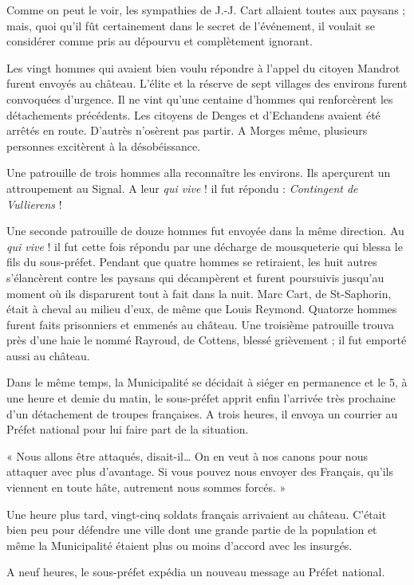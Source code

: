 \documentclass[french,twoside]{book} %
\newenvironment{quoteblock}%
  {\begin{quoting}}
  {\end{quoting}}
\newenvironment{quotebar}{%
    \def\FrameCommand{{\color{rubric!10!}\vrule width 0.5em} \hspace{0.9em}}%
    \def\OuterFrameSep{\itemsep} %
    \MakeFramed {\advance\hsize-\width \FrameRestore}
  }%
  {%
    \endMakeFramed
  }
\renewenvironment{quoteblock}%
  {%
    \savenotes
    \setstretch{0.9}
    \begin{quotebar}
  }
  {%
    \end{quotebar}
    \spewnotes
  }
\begin{document}
\noindent Comme on peut le voir, les sympathies de J.-J. Cart allaient toutes aux paysans ; mais, quoi qu’il fût certainement dans le secret de l’événement, il voulait se considérer comme pris au dépourvu et complètement ignorant.\par
Les vingt hommes qui avaient bien voulu répondre à l’appel du citoyen Mandrot furent envoyés au château. L’élite et la réserve de sept villages des environs furent convoquées d’urgence. Il ne vint qu’une centaine d’hommes qui renforcèrent les détachements précédents. Les citoyens de Denges et d’Echandens avaient été arrêtés en route. D’autrès n’osèrent pas partir. A Morges même, plusieurs personnes excitèrent à la désobéissance.\par
Une patrouille de trois hommes alla reconnaître les environs. Ils aperçurent un attroupement au Signal. A leur \emph{qui vive} ! il fut répondu : \emph{Contingent de Vullierens} !\par
Une seconde patrouille de douze hommes fut envoyée dans la même direction. Au \emph{qui vive} ! il fut cette fois répondu par une décharge de mousqueterie qui blessa le fils du sous-préfet. Pendant que quatre hommes se retiraient, les huit autres s’élancèrent contre les paysans qui décampèrent et furent poursuivis jusqu’au moment où ils disparurent tout à fait dans la nuit. Marc Cart, de St-Saphorin, était à cheval au milieu d’eux, de même que Louis Reymond. Quatorze hommes furent faits prisonniers et emmenés au château. Une troisième patrouille trouva près d’une haie le nommé Rayroud, de Cottens, blessé grièvement ; il fut emporté aussi au château.\par
Dans le même temps, la Municipalité se décidait à siéger en permanence et le 5, à une heure et demie du matin, le sous-préfet apprit enfin l’arrivée très prochaine d’un détachement de troupes françaises. A trois heures, il envoya un courrier au Préfet national pour lui faire part de la situation.\par

\begin{quoteblock}
 \noindent « Nous allons être attaqués, disait-il… On en veut à nos canons pour nous attaquer avec plus d’avantage. Si vous pouvez nous envoyer des Français, qu’ils viennent en toute hâte, autrement nous sommes forcés. »
 \end{quoteblock}

\noindent Une heure plus tard, vingt-cinq soldats français arrivaient au château. C’était bien peu pour défendre une ville dont une grande partie de la population et même la Municipalité étaient plus ou moins d’accord avec les insurgés.\par
A neuf heures, le sous-préfet expédia un nouveau message au Préfet national.\par
\end{document}
